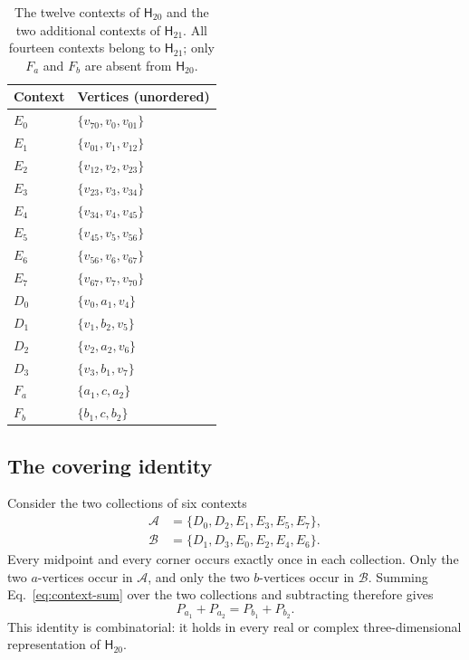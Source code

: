 \documentclass[12pt,a4paper]{article}
\theoremstyle{definition}
\theoremstyle{remark}
\newcommand{\Htwenty}{\mathsf H_{20}}
\newcommand{\Htwentyone}{\mathsf H_{21}}
\begin{document}
\begin{table}[tb]
\caption{The twelve contexts of $\Htwenty$ and the two additional
contexts of $\Htwentyone$.  All fourteen contexts belong to $\Htwentyone$;
only $F_a$ and $F_b$ are absent from $\Htwenty$.}
\label{tab:contexts}
\centering
\begin{tabular}{@{}ll@{}}
\toprule
Context & Vertices (unordered) \\
\midrule
$E_0$ & $\{v_{70},v_0,v_{01}\}$ \\
$E_1$ & $\{v_{01},v_1,v_{12}\}$ \\
$E_2$ & $\{v_{12},v_2,v_{23}\}$ \\
$E_3$ & $\{v_{23},v_3,v_{34}\}$ \\
$E_4$ & $\{v_{34},v_4,v_{45}\}$ \\
$E_5$ & $\{v_{45},v_5,v_{56}\}$ \\
$E_6$ & $\{v_{56},v_6,v_{67}\}$ \\
$E_7$ & $\{v_{67},v_7,v_{70}\}$ \\
\midrule
$D_0$ & $\{v_0,a_1,v_4\}$ \\
$D_1$ & $\{v_1,b_2,v_5\}$ \\
$D_2$ & $\{v_2,a_2,v_6\}$ \\
$D_3$ & $\{v_3,b_1,v_7\}$ \\
\midrule
$F_a$ & $\{a_1,c,a_2\}$ \\
$F_b$ & $\{b_1,c,b_2\}$ \\
\bottomrule
\end{tabular}
\end{table}

\subsection{The covering identity}

Consider the two collections of six contexts
\begin{align*}
 \mathcal A&=\{D_0,D_2,E_1,E_3,E_5,E_7\},\\
 \mathcal B&=\{D_1,D_3,E_0,E_2,E_4,E_6\}.
\end{align*}
Every midpoint and every corner occurs exactly once in each collection.
Only the two $a$-vertices occur in $\mathcal A$, and only the two
$b$-vertices occur in $\mathcal B$.  Summing Eq.~\eqref{eq:context-sum}
over the two collections and subtracting therefore gives
\begin{equation}
 P_{a_1}+P_{a_2}=P_{b_1}+P_{b_2}.
 \label{eq:covering-identity}
\end{equation}
This identity is combinatorial: it holds in every real or complex
three-dimensional representation of $\Htwenty$.
\end{document}
